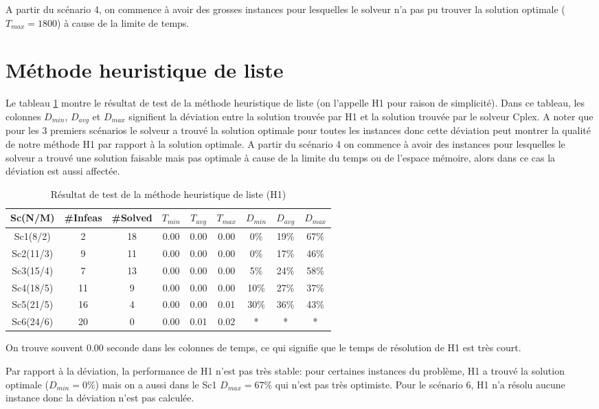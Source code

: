 \documentclass[twoside,fleqn]{EPURapport}
\begin{document}
A partir du scénario 4, on commence à avoir des grosses instances pour lesquelles le solveur n'a pas pu trouver la solution optimale ($T_{max}=1800$) à cause de la limite de temps.

\section{Méthode heuristique de liste}
Le tableau \ref{tab_h1} montre le résultat de test de la méthode heuristique de liste (on l'appelle H1 pour raison de simplicité). Dans ce tableau, les colonnes $D_{min}$, $D_{avg}$ et $D_{max}$ signifient la déviation entre la solution trouvée par H1 et la solution trouvée par le solveur Cplex. A noter que pour les 3 premiers scénarios le solveur a trouvé la solution optimale pour toutes les instances donc cette déviation peut montrer la qualité de notre méthode H1 par rapport à la solution optimale. A partir du scénario 4 on commence à avoir des instances pour lesquelles le solveur a trouvé une solution faisable mais pas optimale à cause de la limite du temps ou de l'espace mémoire, alors dans ce cas la déviation est aussi affectée.


\begin{table}[h]
    \centering
    \begin{tabular}{|c|c|c|c|c|c|c|c|c|}
    	\hline
    	Sc(N/M)	& \#Infeas & \#Solved	& $T_{min}$ & $T_{avg}$	& $T_{max}$ & $D_{min}$ & $D_{avg}$	& $D_{max}$ \\ \hline
		Sc1(8/2)  & 2 & 18 & 0.00 & 0.00 & 0.00 &0\% &19\% &67\% \\ \hline
Sc2(11/3) & 9 & 11 & 0.00 & 0.00 & 0.00 &0\% &17\% &46\% \\ \hline
Sc3(15/4) & 7 & 13 & 0.00 & 0.00 & 0.00 &5\% &24\% &58\% \\ \hline
Sc4(18/5) & 11 & 9 & 0.00 & 0.00 & 0.00 &10\%& 27\%& 37\% \\ \hline
Sc5(21/5) & 16 & 4 & 0.00 & 0.00 & 0.01 &30\%& 36\%& 43\% \\ \hline
Sc6(24/6) & 20 & 0 & 0.00 & 0.01 & 0.02 & * & * & * \\ \hline
    \end{tabular}
    \caption{Résultat de test de la méthode heuristique de liste (H1)}
    \label{tab_h1}
\end{table}
\bigskip

On trouve souvent 0.00 seconde dans les colonnes de temps, ce qui signifie que le temps de résolution de H1 est très court.


Par rapport à la déviation, la performance de H1 n'est pas très stable: pour certaines instances du problème, H1 a trouvé la solution optimale ($D_{min}=0\%$) mais on a aussi dans le Sc1 $D_{max}=67\%$ qui n'est pas très optimiste. Pour le scénario 6, H1 n'a résolu aucune instance donc la déviation n'est pas calculée.
\end{document}
